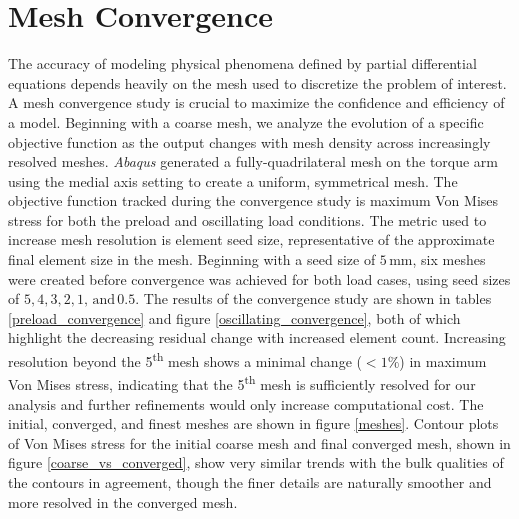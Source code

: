 \documentclass[../main.tex]{subfiles}
\begin{document}
\section{Mesh Convergence}

The accuracy of modeling physical phenomena defined by partial differential equations depends heavily on the mesh used to discretize the problem of interest.
A mesh convergence study is crucial to maximize the confidence and efficiency of a model.
Beginning with a coarse mesh, we analyze the evolution of a specific objective function as the output changes with mesh density across increasingly resolved meshes.
\textit{Abaqus} generated a fully-quadrilateral mesh on the torque arm using the medial axis setting to create a uniform, symmetrical mesh.
The objective function tracked during the convergence study is maximum Von Mises stress for both the preload and oscillating load conditions.
The metric used to increase mesh resolution is element seed size, representative of the approximate final element size in the mesh.
Beginning with a seed size of \(5\,\unit{\milli\meter}\), six meshes were created before convergence was achieved for both load cases, using seed sizes of \(5, 4, 3, 2, 1,\,\textrm{and}\, 0.5\).
The results of the convergence study are shown in tables \ref{preload_convergence} and figure \ref{oscillating_convergence}, both of which highlight the decreasing residual change with increased element count. 
Increasing resolution beyond the 5\textsuperscript{th} mesh shows a minimal change (\(<1\%\)) in maximum Von Mises stress, indicating that the 5\textsuperscript{th} mesh is sufficiently resolved for our analysis and further refinements would only increase computational cost.
The initial, converged, and finest meshes are shown in figure \ref{meshes}.
Contour plots of Von Mises stress for the initial coarse mesh and final converged mesh, shown in figure \ref{coarse_vs_converged}, show very similar trends with the bulk qualities of the contours in agreement, though the finer details are naturally smoother and more resolved in the converged mesh.
\end{document}
